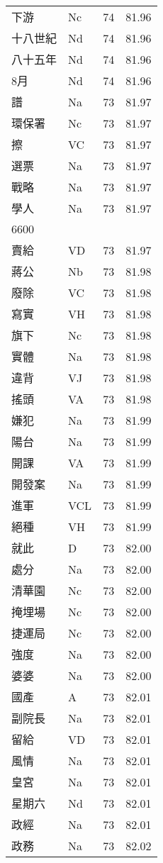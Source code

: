 \documentclass[twocolumn]{book}
\begin{document}
\begin{supertabular}{llrr}
下游 & Nc & 74 &  81.96\\
十八世紀 & Nd & 74 &  81.96\\
八十五年 & Nd & 74 &  81.96\\
8月 & Nd & 74 &  81.96\\
譜 & Na & 73 &  81.97\\
環保署 & Nc & 73 &  81.97\\
擦 & VC & 73 &  81.97\\
選票 & Na & 73 &  81.97\\
戰略 & Na & 73 &  81.97\\
學人 & Na & 73 &  81.97\\
6600\\
賣給 & VD & 73 &  81.97\\
蔣公 & Nb & 73 &  81.98\\
廢除 & VC & 73 &  81.98\\
寫實 & VH & 73 &  81.98\\
旗下 & Nc & 73 &  81.98\\
實體 & Na & 73 &  81.98\\
違背 & VJ & 73 &  81.98\\
搖頭 & VA & 73 &  81.98\\
嫌犯 & Na & 73 &  81.99\\
陽台 & Na & 73 &  81.99\\
開課 & VA & 73 &  81.99\\
開發案 & Na & 73 &  81.99\\
進軍 & VCL & 73 &  81.99\\
絕種 & VH & 73 &  81.99\\
就此 & D & 73 &  82.00\\
處分 & Na & 73 &  82.00\\
清華園 & Nc & 73 &  82.00\\
掩埋場 & Nc & 73 &  82.00\\
捷運局 & Nc & 73 &  82.00\\
強度 & Na & 73 &  82.00\\
婆婆 & Na & 73 &  82.00\\
國產 & A & 73 &  82.01\\
副院長 & Na & 73 &  82.01\\
留給 & VD & 73 &  82.01\\
風情 & Na & 73 &  82.01\\
皇宮 & Na & 73 &  82.01\\
星期六 & Nd & 73 &  82.01\\
政經 & Na & 73 &  82.01\\
政務 & Na & 73 &  82.02\\

\end{supertabular}
\end{document}

